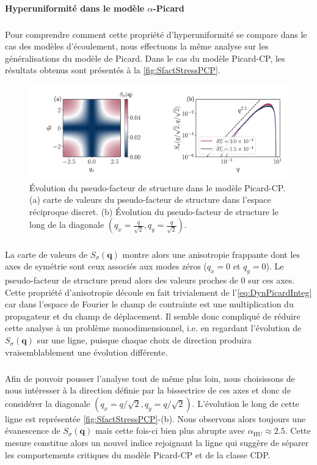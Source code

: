 \paragraph{Hyperuniformité dans le modèle $\alpha$-Picard}

\subparagraph{}Pour comprendre comment cette propriété d'hyperuniformité se compare dans le cas des modèles d'écoulement, nous effectuons la même analyse sur les généralisations du modèle de Picard. Dans le cas du modèle Picard-CP, les résultats obtenus sont présentés à la \autoref{fig:SfactStressPCP}.

\begin{figure}[h]
	\centering
	\includegraphics[width=\textwidth]{Chapitre4/Figures/Correlations/Sfact_SRP.pdf}
	\caption{Évolution du pseudo-facteur de structure dans le modèle Picard-CP. (a) carte de valeurs du pseudo-facteur de structure dans l'espace réciproque discret. (b) Évolution du pseudo-facteur de structure le long de la diagonale $(q_x=\frac{q}{\sqrt{2}},q_y=\frac{q}{\sqrt{2}})$.}
	\label{fig:SfactStressPCP}
\end{figure}

\subparagraph{}La carte de valeurs de $S_\sigma(\mathbf{q})$ montre alors une anisotropie frappante dont les axes de symétrie sont ceux associés aux modes zéros ($q_x=0$ et $q_y=0$). Le pseudo-facteur de structure prend alors des valeurs proches de 0 sur ces axes. Cette propriété d'anisotropie découle en fait trivialement de l'\autoref{eq:DynPicardInteg} car dans l'espace de Fourier le champ de contrainte est une multiplication du propagateur et du champ de déplacement. Il semble donc compliqué de réduire cette analyse à un problème monodimensionnel, i.e. en regardant l'évolution de $S_\sigma(\mathbf{q})$ sur une ligne, puisque chaque choix de direction produira vraisemblablement une évolution différente.

\subparagraph{}Afin de pouvoir pousser l'analyse tout de même plus loin, nous choisissons de nous intéresser à la direction définie par la bissectrice de ces axes et donc de considérer la diagonale $(q_x = q/\sqrt{2}, q_y = q/\sqrt{2})$. L'évolution le long de cette ligne est représentée \autoref{fig:SfactStressPCP}-(b). Nous observons alors toujours une évanescence de $S_\sigma(\mathbf{q})$ mais cette fois-ci bien plus abrupte avec $\alpha_\text{HU} \approx 2.5$. Cette mesure constitue alors un nouvel indice rejoignant la ligne qui suggère de séparer les comportements critiques du modèle Picard-CP et de la classe CDP.

